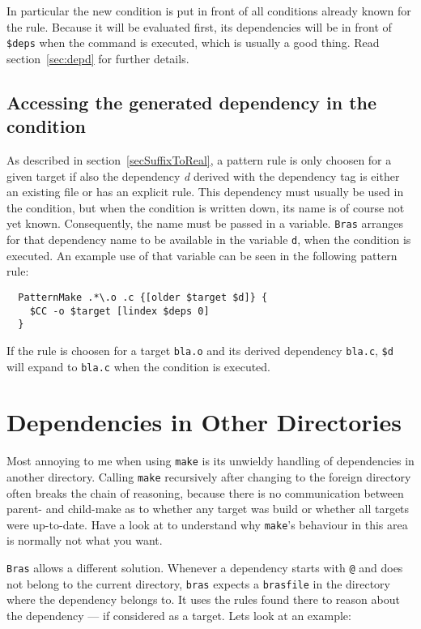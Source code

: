 \documentclass[11pt]{scrartcl}
\makeatletter
\newcommand{\bras}{\texttt{bras}}
\newcommand{\Bras}{\texttt{Bras}}
\newcommand{\make}{\texttt{make}}
\newcommand{\Indextt}[1]{\texttt{#1}\index{#1@\texttt{#1}}}
\makeatother
\begin{document}
In particular the new condition is put in front of all conditions
already known for the rule. Because it will be evaluated first, its
dependencies will be in front of \Indextt{\$deps} when the command is
executed, which is usually a good thing. Read section~\ref{sec:depd}
for further details.
\subsection{Accessing the generated dependency in the condition}
\label{sec:depd}

As described in section~\ref{secSuffixToReal}, a pattern rule is only
choosen for a given target if also the dependency \textit{d} derived
with the dependency tag is either an existing file or has an explicit
rule. This dependency must usually be used in the condition, but when
the condition is written down, its name is of course not yet
known. Consequently, the name must be passed in a variable. \Bras{}
arranges for that dependency name to be available in the variable
\Indextt{d}, when the condition is executed. An example use of that
variable can be seen in the following pattern rule:
\begin{verbatim}
  PatternMake .*\.o .c {[older $target $d]} {
    $CC -o $target [lindex $deps 0]
  }
\end{verbatim}
If the rule is choosen for a target \texttt{bla.o} and its derived
dependency \texttt{bla.c}, \texttt{\$d} will expand to \texttt{bla.c}
when the condition is executed.


\section{Dependencies in Other Directories}
\label{secForeignDeps}

Most annoying to me when using \make{} is its unwieldy handling of
dependencies in another directory. Calling \make{} recursively after
changing to the foreign directory often breaks the chain of reasoning,
because there is no communication between parent- and child-make as to
whether any target was build or whether all targets were
up-to-date. Have a look at \cite{Mil97} to understand why \make's
behaviour in this area is normally not what you want.

\Bras{} allows a different solution. Whenever a dependency starts with
\texttt{@} and does not belong to the current
directory, \bras{} expects a \texttt{brasfile} in the directory where
the dependency belongs to. It uses the rules found there to reason
about the dependency --- if considered as a target. Lets look at an
example:
\end{document}
